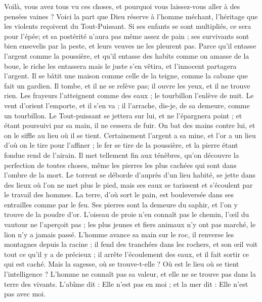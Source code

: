 \begin{multicols}{2}
{Voilà, vous avez tous vu ces choses, et pourquoi vous laissez-vous aller à des pensées vaines ?
Voici la part que Dieu réserve à l'homme méchant, l'héritage que les violents reçoivent du Tout-Puissant.
Si ses enfants se sont multipliés, ce sera pour l'épée; et sa postérité n'aura pas même assez de pain ;
ses survivants sont bien ensevelis par la peste, et leurs veuves ne les pleurent pas.
Parce qu’il entasse l'argent comme la poussière, et qu'il entasse des habits comme on amasse de la boue,
le riche les entassera mais le juste s'en vêtira, et l'innocent partagera l'argent.
Il se bâtit une maison comme celle de la teigne, comme la cabane que fait un gardien.
Il tombe, et il ne se relève pas; il ouvre les yeux, et il ne trouve rien.
Les frayeurs l'atteignent comme des eaux ; le tourbillon l'enlève de nuit.
Le vent d'orient l'emporte, et il s'en va ; il l'arrache, dis-je, de sa demeure, comme un tourbillon.
 Le Tout-puissant se jettera sur lui, et ne l'épargnera point ; et étant poursuivi par sa main, il ne cessera de fuir.
On bat des mains contre lui, et on le siffle au lieu où il se tient.
\VerseOne{}Certainement l'argent a sa mine, et l'or a un lieu d'où on le tire pour l'affiner ;
le fer se tire de la poussière, et la pierre étant fondue rend de l'airain.
Il met tellement fin aux ténèbres, qu'on découvre la perfection de toutes choses, même les pierres les plus cachées qui sont dans l'ombre de la mort.
Le torrent se déborde d'auprès d'un lieu habité, se jette dans des lieux où l'on ne met plus le pied, mais ses eaux se tarissent et s'écoulent par le travail des hommes.
La terre, d'où sort le pain, est bouleversée dans ses entrailles comme par le feu.
Ses pierres sont la demeure du saphir, et l'on y trouve de la poudre d'or.
L'oiseau de proie n'en connaît pas le chemin, l'œil du vautour ne l'aperçoit pas ;
les plus jeunes et fiers animaux n'y ont pas marché, le lion n'y a jamais passé.
L'homme avance sa main sur le roc, il renverse les montagnes depuis la racine ;
il fend des tranchées dans les rochers, et son œil voit tout ce qu'il y a de précieux ;
il arrête l'écoulement des eaux, et il fait sortir ce qui est caché.
Mais la sagesse, où se trouve-t-elle ? Où est le lieu où se tient l'intelligence ?
L'homme ne connaît pas sa valeur, et elle ne se trouve pas dans la terre des vivants.
L'abîme dit : Elle n'est pas en moi ; et la mer dit : Elle n'est pas avec moi.
}
\end{multicols}

